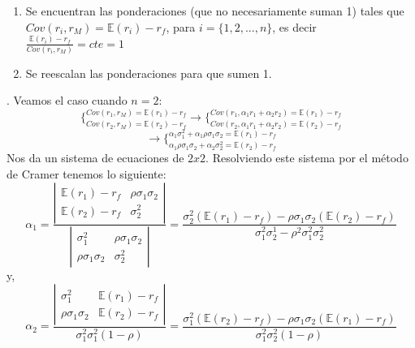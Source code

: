 \documentclass[12pts]{extarticle}
\begin{document}
\begin{enumerate} 
\item Se encuentran las ponderaciones (que no necesariamente suman 1) tales que \\$Cov(r_i, r_M)= \mathbb{E}(r_i)-r_f$, para  $i= \{1,2,...,n\} $, es decir $\frac{\mathbb{E}(r_i)-r_f}{Cov(r_i,r_M)}=cte=1$
\item Se reescalan las ponderaciones para que sumen 1. 
\end{enumerate}.
Veamos el caso cuando $n=2$: 
$$\bigg\{_{Cov(r_2, r_M)=\mathbb{E}(r_2)-r_f} ^{Cov(r_1, r_M)= \mathbb{E}(r_1)-r_f} \rightarrow \bigg\{_{Cov(r_2, \alpha_1 r_1 +\alpha_2 r_2)=\mathbb{E}(r_2)-r_f } ^{Cov(r_1, \alpha_1 r_1 +\alpha_2 r_2)=\mathbb{E}(r_1)-r_f}$$ 
$$\rightarrow \bigg\{_{\alpha_1 \rho \sigma_1 \sigma_2 +\alpha_2\sigma_2^2 =\mathbb{E}(r_2)-r_f} ^{\alpha_1 \sigma_1^2 +\alpha_1\rho\sigma_1\sigma_2 =\mathbb{E}(r_1)-r_f}$$
Nos da un sistema de ecuaciones de $2x2$. Resolviendo este sistema por el método de Cramer tenemos lo siguiente:
 $$ \alpha_1=\frac{\left| \begin{array}{cc}
                                    \mathbb{E}(r_1)-r_f & \rho\sigma_1\sigma_2 \\
                                    \mathbb{E}(r_2)-r_f & \sigma_2^2
                                          \end{array} \right|}{\left| \begin{array}{cc}
                                                                                     \sigma_1^2 & \rho\sigma_1\sigma_2\\
                                                                                     \rho\sigma_1\sigma_2 & \sigma_2^2
                                                                                     \end{array} \right|} =\frac{\sigma_2^2(\mathbb{E}(r_1)-r_f)-\rho\sigma_1\sigma_2( \mathbb{E}(r_2)-r_f)}{\sigma_1^2\sigma_2^1 -\rho^2\sigma_1^2\sigma_2^2} $$
y, 
$$\alpha_2=\frac{\left| \begin{array}{cc}
                                        \sigma_1^2 & \mathbb{E}(r_1)-r_f\\
                                        \rho\sigma_1\sigma_2 & \mathbb{E}(r_2)-r_f
                                        \end{array} \right|}{\sigma_1^2\sigma_1^2 (1-\rho)} = \frac{\sigma_1^2 (\mathbb{E}(r_2)-r_f)-\rho\sigma_1\sigma_2(\mathbb{E}(r_1)-r_f)}{\sigma_1^2\sigma_2^2(1-\rho)}$$
\end{document}
